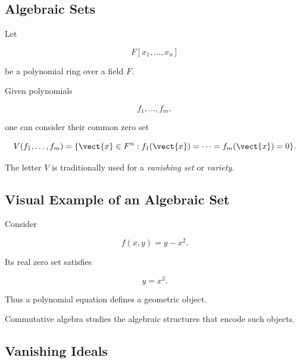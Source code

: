 \subsection{Algebraic Sets}
\label{subsec:commutative-algebraic-sets}

Let

\[ F[x_1,\ldots,x_n] \]

be a polynomial ring over a field \(F\).

Given polynomials

\[ f_1,\ldots,f_m, \]

one can consider their common zero set

\[ V(f_1,\ldots,f_m)
=\{\vect{x}\in F^n:f_1(\vect{x})=\cdots=f_m(\vect{x})=0\}. \]

The letter \(V\) is traditionally used for a \emph{vanishing set} or
\emph{variety}.

\subsection{Visual Example of an Algebraic Set}
\label{subsec:algebraic-set-visual}

Consider

\[ f(x,y)=y-x^2. \]

Its real zero set satisfies

\[ y=x^2. \]

\begin{center}
\end{center}

Thus a polynomial equation defines a geometric object.

Commutative algebra studies the algebraic structures that encode such
objects.

\subsection{Vanishing Ideals}
\label{subsec:vanishing-ideals}


